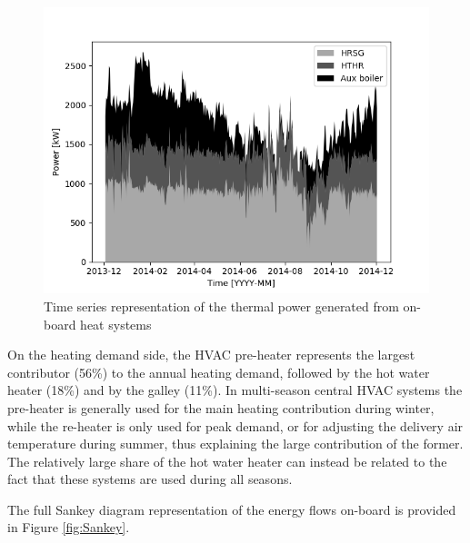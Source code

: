 \documentclass[preprint,12pt]{elsarticle}
\begin{document}
\begin{figure}
	\centering
	\includegraphics[width=0.99\linewidth]{Figures/TimeSeries_HeatGeneration}
	\caption{Time series representation of the thermal power generated from on-board heat systems}
	\label{fig:TimeSeries_HeatGeneration}
\end{figure}


On the heating demand side, the HVAC pre-heater represents the largest contributor (56\%) to the annual heating demand, followed by the hot water heater (18\%) and by the galley (11\%). In multi-season central HVAC systems the pre-heater is generally used for the main heating contribution during winter, while the re-heater is only used for peak demand, or for adjusting the delivery air temperature during summer, thus explaining the large contribution of the former. The relatively large share of the hot water heater can instead be related to the fact that these systems are used during all seasons.

The full Sankey diagram representation of the energy flows on-board is provided in Figure \ref{fig:Sankey}. 
\end{document}
